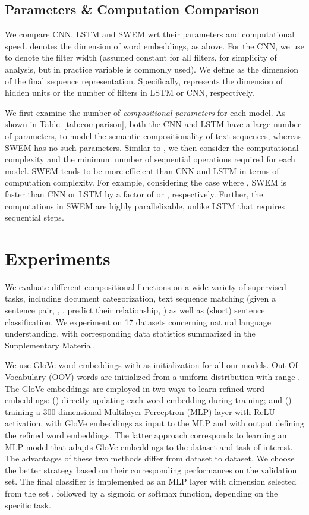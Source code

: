 \documentclass[11pt,a4paper]{article}
\begin{document}
\subsection{Parameters \& Computation Comparison}\label{compare}
\vspace{-1mm}
We compare CNN, LSTM and SWEM wrt their parameters and computational speed.
 denotes the dimension of word embeddings, as above.
For the CNN, we use  to denote the filter width (assumed constant for all filters, for simplicity of analysis, but in practice variable  is commonly used).
We define  as the dimension of the final sequence representation.
Specifically,  represents the dimension of hidden units or the number of filters in LSTM or CNN, respectively.

We first examine the number of \emph{compositional parameters} for each model.
As shown in Table~\ref{tab:comparison}, both the CNN and LSTM have a large number of parameters, to model the semantic compositionality of text sequences, whereas SWEM has no such parameters.
Similar to \citet{vaswani2017attention}, we then consider the computational complexity and the minimum number of sequential operations required for each model.
SWEM tends to be more efficient than CNN and LSTM in terms of computation complexity.
For example, considering the case where , SWEM is faster than CNN or LSTM by a factor of  or , respectively.
Further, the computations in SWEM are highly parallelizable, unlike LSTM that requires  sequential steps.

\section{Experiments}\label{experiments}
\vspace{-1mm}
We evaluate different compositional functions on a wide variety of supervised tasks, including document categorization, text sequence matching (given a sentence pair, , , predict their relationship, ) as well as (short) sentence classification.
We experiment on 17 datasets concerning natural language understanding, with corresponding data statistics summarized in the Supplementary Material.


We use GloVe word embeddings with  \citep{pennington2014glove} as initialization for all our models. 
Out-Of-Vocabulary (OOV) words are initialized from a uniform distribution with range .
The GloVe embeddings are employed in two ways to learn refined word embeddings: () directly updating each word embedding during training; and () training a 300-dimensional Multilayer Perceptron (MLP) layer with ReLU activation, with GloVe embeddings as input to the MLP and with output defining the refined word embeddings.
The latter approach corresponds to learning an MLP model that adapts GloVe embeddings to the dataset and task of interest.
The advantages of these two methods differ from dataset to dataset.
We choose the better strategy based on their corresponding performances on the validation set.
The final classifier is implemented as an MLP layer with dimension selected from the set , followed by a sigmoid or softmax function, depending on the specific task.
\end{document}
